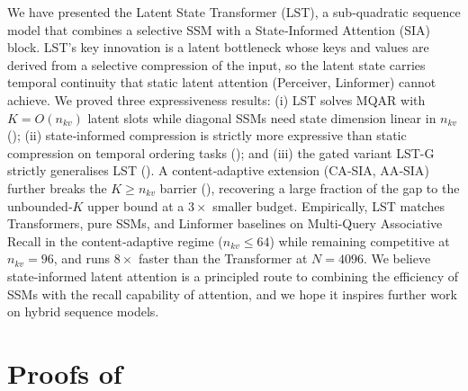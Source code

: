 \documentclass[10pt,twocolumn,letterpaper]{article}
\newcommand{\LST}{\textsc{LST}}
\newcommand{\SIA}{\textsc{SIA}}
\begin{document}
We have presented the Latent State Transformer (\LST{}), a sub‑quadratic sequence model that combines a selective SSM with a State‑Informed Attention (\SIA{}) block.  \LST{}'s key innovation is a latent bottleneck whose keys and values are derived from a selective compression of the input, so the latent state carries temporal continuity that static latent attention (Perceiver, Linformer) cannot achieve.  We proved three expressiveness results: (i) \LST{} solves MQAR with $K\!=\!O(n_{kv})$ latent slots while diagonal SSMs need state dimension linear in $n_{kv}$ (); (ii) state‑informed compression is strictly more expressive than static compression on temporal ordering tasks (); and (iii) the gated variant \LST-G{} strictly generalises \LST{} ().  A content‑adaptive extension (CA‑\SIA{}, AA‑\SIA{}) further breaks the $K\!\geq\!n_{kv}$ barrier (), recovering a large fraction of the gap to the unbounded‑$K$ upper bound at a $3\!\times$ smaller budget.  Empirically, \LST{} matches Transformers, pure SSMs, and Linformer baselines on Multi‑Query Associative Recall in the content‑adaptive regime ($n_{kv}\!\le\!64$) while remaining competitive at $n_{kv}\!=\!96$, and runs $8\times$ faster than the Transformer at $N\!=\!4096$.  We believe state‑informed latent attention is a principled route to combining the efficiency of SSMs with the recall capability of attention, and we hope it inspires further work on hybrid sequence models.




\appendix
\section{Proofs of \texorpdfstring{}{Thm.~1, Prop.~2-3, Thm.~4}}
\label{app:proofs}
\end{document}
